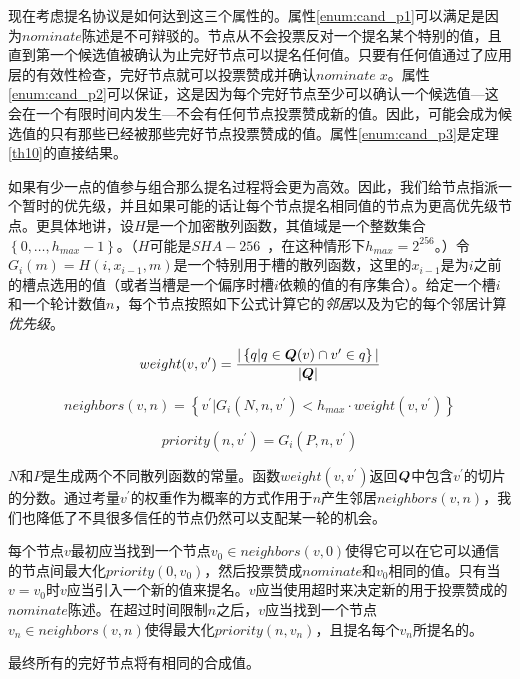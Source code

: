 现在考虑提名协议是如何达到这三个属性的。属性\ref{enum:cand_p1}可以满足是因为$nominate$陈述是不可辩驳的。节点从不会投票反对一个提名某个特别的值，且直到第一个候选值被确认为止完好节点可以提名任何值。只要有任何值通过了应用层的有效性检查，完好节点就可以投票赞成并确认$nominate\;x$。属性\ref{enum:cand_p2}可以保证，这是因为每个完好节点至少可以确认一个候选值---这会在一个有限时间内发生---不会有任何节点投票赞成新的值。因此，可能会成为候选值的只有那些已经被那些完好节点投票赞成的值。属性\ref{enum:cand_p3}是定理\ref{th10}的直接结果。

如果有少一点的值参与组合那么提名过程将会更为高效。因此，我们给节点指派一个暂时的优先级，并且如果可能的话让每个节点提名相同值的节点为更高优先级节点。更具体地讲，设$H$是一个加密散列函数，其值域是一个整数集合$\left\{0,\dots,h_{max}-1\right\}$。（$H$可能是$SHA-256$~\cite{shs2015}，在这种情形下$h_{max}=2^{256}$。）令$G_i(m)=H(i, x_{i-1},m)$是一个特别用于槽的散列函数，这里的$x_{i-1}$是为$i$之前的槽点选用的值（或者当槽是一个偏序时槽$i$依赖的值的有序集合）。给定一个槽$i$和一个轮计数值$n$，每个节点按照如下公式计算它的\textit{邻居}以及为它的每个邻居计算\textit{优先级}。

\begin{equation*}
	weight(v,v^{\prime}) = \frac{|\left\{q|q\in{\bm Q}(v)\cap v^{\prime}\in q\right\}|}{|{\bm Q}|}
\end{equation*}

\begin{equation*}
	neighbors(v,n) = \left\{v^{\prime}|G_i(N,n,v^{\prime})<h_{max}\cdot weight(v,v^{\prime})\right\}
\end{equation*}

\begin{equation*}
	priority(n,v^{\prime}) = G_i(P,n,v^{\prime})
\end{equation*}

$N$和$P$是生成两个不同散列函数的常量。函数$weight(v,v^{\prime})$返回${\bm Q}$中包含$v^{\prime}$的切片的分数。通过考量$v^{\prime}$的权重作为概率的方式作用于$n$产生邻居$neighbors(v,n)$，我们也降低了不具很多信任的节点仍然可以支配某一轮的机会。

每个节点$v$最初应当找到一个节点$v_0\in neighbors(v,0)$使得它可以在它可以通信的节点间最大化$priority(0,v_0)$，然后投票赞成$nominate$和$v_0$相同的值。只有当$v=v_0$时$v$应当引入一个新的值来提名。$v$应当使用超时来决定新的用于投票赞成的$nominate$陈述。在超过时间限制$n$之后，$v$应当找到一个节点$v_n\in neighbors(v,n)$使得最大化$priority(n,v_n)$，且提名每个$v_n$所提名的。

\begin{theorem}\label{th11}
	最终所有的完好节点将有相同的合成值。
\end{theorem}

